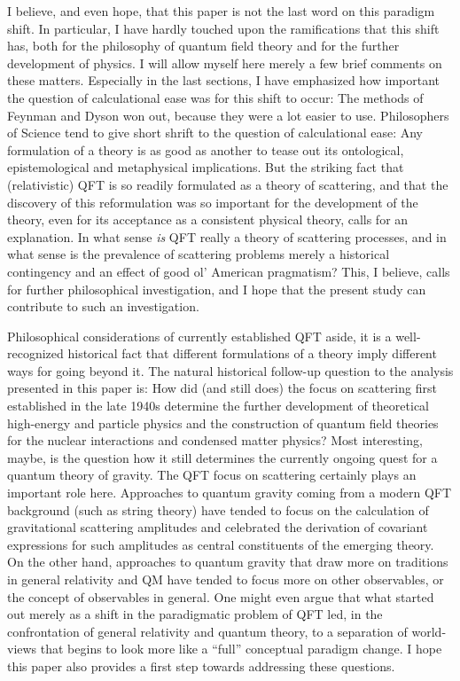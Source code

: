 \documentclass[12pt]{article}
\begin{document}
I believe, and even hope, that this paper is not the last word on this paradigm shift. In particular, I have hardly touched upon the ramifications that this shift has, both for the philosophy of quantum field theory and for the further development of physics. I will allow myself here merely a few brief comments on these matters. Especially in the last sections, I have emphasized how important the question of calculational ease was for this shift to occur: The methods of Feynman and Dyson won out, because they were a lot easier to use. Philosophers of Science tend to give short shrift to the question of calculational ease: Any formulation of a theory is as good as another to tease out its ontological, epistemological and metaphysical implications. But the striking fact that (relativistic) QFT is so readily formulated as a theory of scattering, and that the discovery of this reformulation was so important for the development of the theory, even for its acceptance as a consistent physical theory, calls for an explanation. In what sense \emph{is} QFT really a theory of scattering processes, and in what sense is the prevalence of scattering problems merely a historical contingency and an effect of good ol' American pragmatism? This, I believe, calls for further philosophical investigation, and I hope that the present study can contribute to such an investigation.

Philosophical considerations of currently established QFT aside, it is a well-recognized historical fact that different formulations of a theory imply different  ways for going beyond it. The natural historical follow-up question to the analysis presented in this paper is: How did (and still does) the focus on scattering first established in the late 1940s determine the further development of theoretical high-energy and particle physics and the construction of quantum field theories for the nuclear interactions and condensed matter physics? Most interesting, maybe, is the question how it still determines the currently ongoing quest for a quantum theory of gravity. The QFT focus on scattering certainly plays an important role here. Approaches to quantum gravity coming from a modern QFT background (such as string theory) have tended to focus on the calculation of gravitational scattering amplitudes  and celebrated the derivation of covariant expressions for such amplitudes as central constituents of the emerging theory. On the other hand, approaches to quantum gravity that draw more on traditions in general relativity and QM have tended to focus more on other observables, or the concept of observables in general. One might even argue that what started out merely as a shift in the paradigmatic problem of QFT led, in the confrontation of general relativity and quantum theory, to a separation of world-views that begins to look more like a ``full'' conceptual paradigm change. I hope this paper also provides a first step towards addressing these questions.
\end{document}

